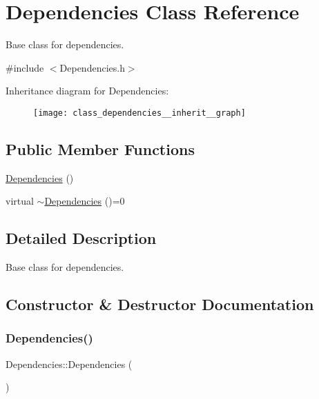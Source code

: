 \hypertarget{class_dependencies}{}\section{Dependencies Class Reference}
\label{class_dependencies}


Base class for dependencies.  




{\ttfamily \#include $<$Dependencies.\+h$>$}



Inheritance diagram for Dependencies\+:\nopagebreak
\begin{figure}[H]
\begin{center}
\leavevmode
\texttt{[image: class\_dependencies\_\_inherit\_\_graph]}
\end{center}
\end{figure}
\subsection*{Public Member Functions}
\begin{DoxyCompactItemize}
\item 
\hyperlink{class_dependencies_afb4e8de48db17417cb0b3e5b57a17af4}{Dependencies} ()
\item 
virtual \hyperlink{class_dependencies_aeaa0706664765dd19c545f9683bf1aea}{$\sim$\+Dependencies} ()=0
\end{DoxyCompactItemize}


\subsection{Detailed Description}
Base class for dependencies. 

\subsection{Constructor \& Destructor Documentation}
\mbox{\label{class_dependencies_afb4e8de48db17417cb0b3e5b57a17af4}} 
\subsubsection{\texorpdfstring{Dependencies()}{Dependencies()}}
{\footnotesize\ttfamily Dependencies\+::\+Dependencies (\begin{DoxyParamCaption}{ }\end{DoxyParamCaption})}

